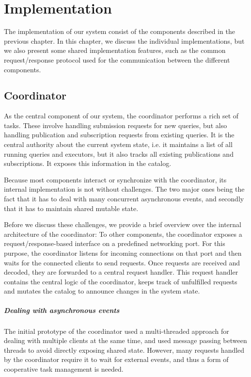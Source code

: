 \chapter{Implementation}\label{ch:impl}

The implementation of our system consist of the components described in the
previous chapter. In this chapter, we discuss the individual implementations,
but we also present some shared implementation features, such as the common
request/response protocol used for the communication between the different
components.

\section{Coordinator}

As the central component of our system, the coordinator performs a rich
set of tasks. These involve handling submission requests for new queries,
but also handling publication and subscription requests from existing queries.
It is the central authority about the current system state, i.e. it maintains
a list of all running queries and executors, but it also tracks all existing
publications and subscriptions. It exposes this information in the catalog.

Because most components interact or synchronize with the coordinator, its
internal implementation is not without challenges. The two major ones
being the fact that it has to deal with many concurrent asynchronous events,
and secondly that it has to maintain shared mutable state.

Before we discuss these challenges, we provide a brief overview over the
internal architecture of the coordinator: To other components, the coordinator
exposes a request/response-based interface on a predefined networking port.
For this purpose, the coordinator listens for incoming connections on that port
and then waits for the connected clients to send requests. Once requests are
received and decoded, they are forwarded to a central request handler. This
request handler contains the central logic of the coordinator, keeps track of
unfulfilled requests and mutates the catalog to announce changes in the
system state.

\paragraph{Dealing with asynchronous events}
The initial prototype of the coordinator used a multi-threaded approach for dealing
with multiple clients at the same time, and used message passing between threads
to avoid directly exposing shared state. However, many requests handled by
the coordinator require it to wait for external events, and thus a form of
cooperative task management is needed.

